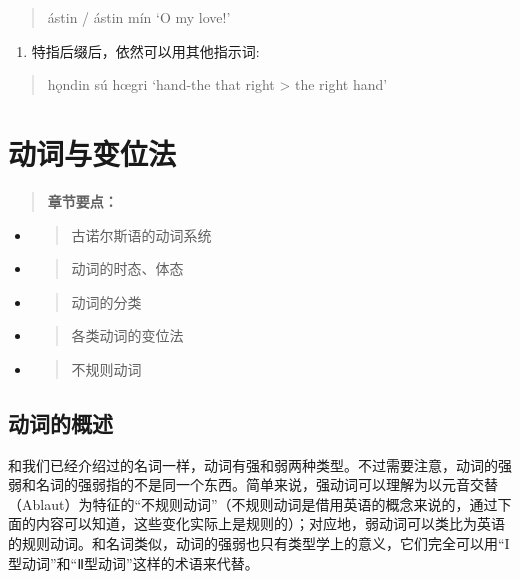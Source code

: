 \begin{quote}
  ástin / ástin mín `O my love!'
\end{quote}

\begin{enumerate}
  \def\labelenumi{\arabic{enumi})}
  \setcounter{enumi}{2}
  \item
        特指后缀后，依然可以用其他指示词:
\end{enumerate}

\begin{quote}
  hǫndin sú hœgri `hand-the that right \textgreater{} the right hand'
\end{quote}

\chapter{动词与变位法}\label{动词与变位法}

\begin{quote}
  \textbf{章节要点：}
\end{quote}

\begin{itemize}
  \item
        \begin{quote}
          古诺尔斯语的动词系统
        \end{quote}
  \item
        \begin{quote}
          动词的时态、体态
        \end{quote}
  \item
        \begin{quote}
          动词的分类
        \end{quote}
  \item
        \begin{quote}
          各类动词的变位法
        \end{quote}
  \item
        \begin{quote}
          不规则动词
        \end{quote}
\end{itemize}

\section{动词的概述}\label{动词的概述}

和我们已经介绍过的名词一样，动词有强和弱两种类型。不过需要注意，动词的强弱和名词的强弱指的不是同一个东西。简单来说，强动词可以理解为以元音交替（Ablaut）为特征的``不规则动词''（不规则动词是借用英语的概念来说的，通过下面的内容可以知道，这些变化实际上是规则的）；对应地，弱动词可以类比为英语的规则动词。和名词类似，动词的强弱也只有类型学上的意义，它们完全可以用``I型动词''和``Ⅱ型动词''这样的术语来代替。

